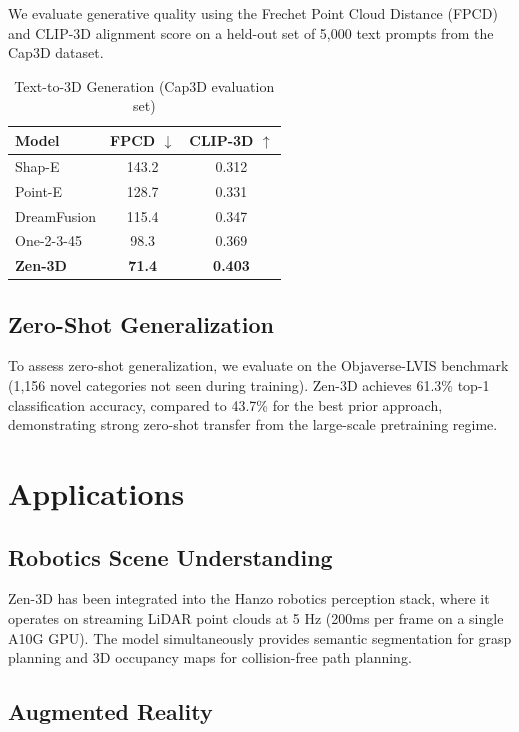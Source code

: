 \documentclass[11pt,a4paper]{article}
\begin{document}
We evaluate generative quality using the Frechet Point Cloud Distance (FPCD) and CLIP-3D alignment
score on a held-out set of 5,000 text prompts from the Cap3D dataset.

\begin{table}[H]
\centering
\begin{tabular}{lcc}
\toprule
\textbf{Model} & \textbf{FPCD} $\downarrow$ & \textbf{CLIP-3D} $\uparrow$ \\
\midrule
Shap-E & 143.2 & 0.312 \\
Point-E & 128.7 & 0.331 \\
DreamFusion & 115.4 & 0.347 \\
One-2-3-45 & 98.3 & 0.369 \\
\textbf{Zen-3D} & \textbf{71.4} & \textbf{0.403} \\
\bottomrule
\end{tabular}
\caption{Text-to-3D Generation (Cap3D evaluation set)}
\end{table}

\subsection{Zero-Shot Generalization}

To assess zero-shot generalization, we evaluate on the Objaverse-LVIS benchmark (1,156 novel
categories not seen during training). Zen-3D achieves 61.3\% top-1 classification accuracy,
compared to 43.7\% for the best prior approach, demonstrating strong zero-shot transfer from
the large-scale pretraining regime.

\section{Applications}

\subsection{Robotics Scene Understanding}

Zen-3D has been integrated into the Hanzo robotics perception stack, where it operates on
streaming LiDAR point clouds at 5 Hz (200ms per frame on a single A10G GPU). The model
simultaneously provides semantic segmentation for grasp planning and 3D occupancy maps for
collision-free path planning.

\subsection{Augmented Reality}
\end{document}
